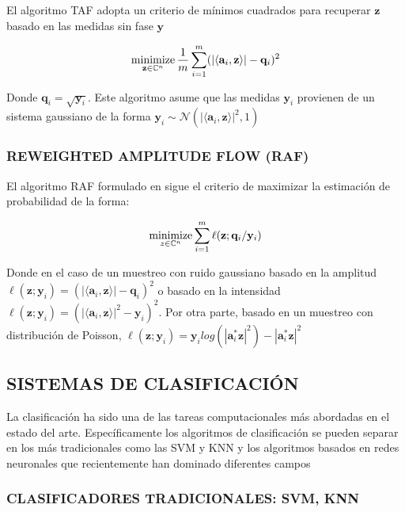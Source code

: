 El algoritmo TAF \cite{wang2017solving} adopta un criterio de mínimos cuadrados para recuperar $\mathbf{z}$ basado en las medidas sin fase $\mathbf{y}$ 

\begin{equation}
    \operatorname*{minimize}_{\mathbf{z} \in \mathbb{C}^{n}} \frac{1}{m} \sum_{i=1}^{m} (\vert \langle \mathbf{a}_i,\mathbf{z}\rangle \vert - \mathbf{q}_i)^2
\end{equation}

Donde $\mathbf{q}_i = \sqrt{\mathbf{y}_i}$. Este algoritmo asume que las medidas $\mathbf{y}_i$ provienen de un sistema gaussiano de la forma $\mathbf{y}_i \sim \mathcal{N}(\vert \langle \mathbf{a}_i,\mathbf{z}\rangle \vert^2, 1)$

\subsubsection{REWEIGHTED AMPLITUDE FLOW (RAF)}

El algoritmo RAF formulado en \cite{wang2018phase} sigue el criterio de maximizar la estimación de probabilidad de la forma:

\begin{equation}
    \operatorname*{minimize}_{z \in \mathbb{C}^{n}} \sum_{i=1}^{m} \ell(\mathbf{z};\mathbf{q}_i/\mathbf{y}_i)
\end{equation}

Donde en el caso de un muestreo con ruido gaussiano basado en la amplitud $\ell(\mathbf{z};\mathbf{y}_i) = (\vert \langle \mathbf{a}_i,\mathbf{z}\rangle \vert - \mathbf{q}_i)^2$ o basado en la intensidad  $\ell(\mathbf{z};\mathbf{y}_i) = (\vert \langle \mathbf{a}_i,\mathbf{z}\rangle \vert^2 - \mathbf{y}_i)^2$. Por otra parte, basado en un muestreo con distribución de Poisson, $\ell(\mathbf{z};\mathbf{y}_i) = { \mathbf{y}_i log(|\mathbf{a}_i^* \mathbf{z}|^2) -|\mathbf{a}_i^* \mathbf{z}|^2 }$ 

\subsection{SISTEMAS DE CLASIFICACIÓN}

La clasificación ha sido una de las tareas computacionales más abordadas en el estado del arte. Específicamente los algoritmos de clasificación se pueden separar en los más tradicionales como las SVM y KNN\cite{kim12012comparing} y los algoritmos basados en redes neuronales que recientemente han dominado diferentes campos\cite{li2019deep,li2018deep, wang2019development}
\subsubsection{CLASIFICADORES TRADICIONALES: SVM, KNN}

